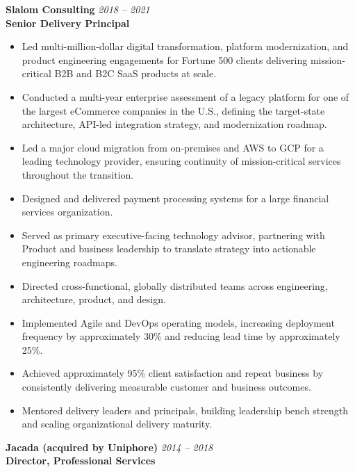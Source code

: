 \documentclass[11pt]{article}
\begin{document}
\vspace{6pt}

\pagebreak

\textbf{Slalom Consulting} \hfill \textit{2018 -- 2021} \\
\textbf{Senior Delivery Principal}

\begin{itemize}
  \item Led multi-million-dollar digital transformation, platform modernization, and product engineering engagements for Fortune 500 clients delivering mission-critical B2B and B2C SaaS products at scale.
  \item Conducted a multi-year enterprise assessment of a legacy platform for one of the largest eCommerce companies in the U.S., defining the target-state architecture, API-led integration strategy, and modernization roadmap.
  \item Led a major cloud migration from on-premises and AWS to GCP for a leading technology provider, ensuring continuity of mission-critical services throughout the transition.
  \item Designed and delivered payment processing systems for a large financial services organization.
  \item Served as primary executive-facing technology advisor, partnering with Product and business leadership to translate strategy into actionable engineering roadmaps.
  \item Directed cross-functional, globally distributed teams across engineering, architecture, product, and design.
  \item Implemented Agile and DevOps operating models, increasing deployment frequency by approximately 30\% and reducing lead time by approximately 25\%.
  \item Achieved approximately 95\% client satisfaction and repeat business by consistently delivering measurable customer and business outcomes.
  \item Mentored delivery leaders and principals, building leadership bench strength and scaling organizational delivery maturity.
\end{itemize}

\vspace{6pt}

\textbf{Jacada (acquired by Uniphore)} \hfill \textit{2014 -- 2018} \\
\textbf{Director, Professional Services}
\end{document}
